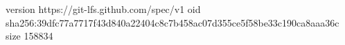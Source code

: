 version https://git-lfs.github.com/spec/v1
oid sha256:39dfc77a7717f43d840a22404c8c7b458ac07d355ce5f58be33c190ca8aaa36c
size 158834
